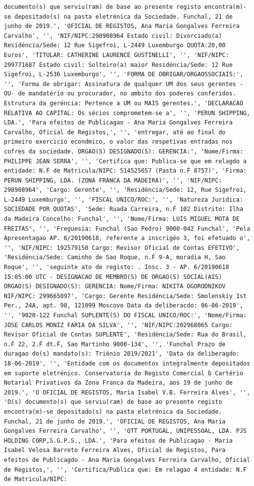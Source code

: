 \documentclass[
  12pt,
]{article}
\begin{document}
\begin{verbatim}
documento(s) que serviu(ram) de base ao presente registo encontra(m)-se depositado(s) na pasta eletrénica da Sociedade. Funchal, 21 de junho de 2019.', 'OFICIAL DE REGISTOS, Ana Maria Gongalves Ferreira Carvalho', '', 'NIF/NIPC:298908964 Estado civil: Divorciado(a) Residéncia/Sede: 12 Rue Sigefroi, L-2449 Luxemburgo QUOTA:20,00 Euros', 'TITULAR: CATHERINE LAURENCE GUSTINELLI', '', 'NIF/NIPC: 299771687 Estado civil: Solteiro(a) maior Residéncia/Sede: 12 Rue Sigefroi, L-2536 Luxemburgo', '', 'FORMA DE OBRIGAR/ORGAOSSOCIAIS:', '', 'Forma de obrigar: Assinatura de qualquer UM dos seus gerentes -OU- de mandatério ou procurador, no ambito dos poderes conferidos. Estrutura da geréncia: Pertence a UM ou MAIS gerentes.', 'DECLARACAO RELATIVA AO CAPITAL: Os sécios comprometem-se a', '', 'PERUN SHIPPING, LDA.', 'Para efeitos de Publicagao - Ana Maria Gongalves Ferreira Carvalho, Oficial de Registos,', '', 'entregar, até ao final do primeiro exercicio econdmico, o valor das respetivas entradas nos cofres da sociedade. ORGAO(S) DESIGNADO(S): GERENCIA:', 'Nome/Firma: PHILIPPE JEAN SERRA', '', 'Certifica que: Publica-se que em relagdo a entidade: N.Ḟ de Matricula/NIPC: 514525657 (Pasta n.Ḟ 8757)', 'Firma: PERUN SHIPPING, LDA. (ZONA FRANCA DA MADEIRA)', '', 'NIF/NIPC: 298908964', 'Cargo: Gerente', '', 'Residéncia/Sede: 12, Rue Sigefroi, L-2449 Luxemburgo', '', 'FISCAL UNICO/ROC:', '', 'Natureza Juridica: SOCIEDADE POR QUOTAS', 'Sede: Ruada Carreira, n.Ḟ 102 Distrito: Ilha da Madeira Concelho: Funchal', '', 'Nome/Firma: LUIS MIGUEL MOTA DE FREITAS', '', 'Freguesia: Funchal (Sao Pedro) 9000-042 Funchal', 'Pela Apresentagao AP. 6/20190618, referente a inscrigéo 3, foi efetuado o', '', 'NIF/NIPC: 192579150 Cargo: Revisor Oficial de Contas EFETIVO', 'Residéncia/Sede: Caminho de Sao Roque, n.Ḟ 9-A, moradia H, Sao Roque', '', 'seguinte ato de registo: . Insc. 3 - AP. 6/20190618 15:05:00 UTC - DESIGNACAO DE MEMBRO(S) DE ORGAO(S) SOCIAL(AIS) ORGAO(S) DESIGNADO(S): GERENCIA: Nome/Firma: NIKITA OGORODNIKOV NIF/NIPC: 299665097', 'Cargo: Gerente Residéncia/Sede: Smolenskiy 1st Per., 24A, apt. 98, 121099 Moscovo Data da deliberacdo: 06-06-2019', '', '9020-122 Funchal SUPLENTE(S) DO FISCAL UNICO/ROC:', 'Nome/Firma: JOSE CARLOS MONIZ FARIA DA SILVA', '', 'NIF/NIPC:202968065 Cargo: Revisor Oficial de Contas SUPLENTE', 'Residéncia/Sede: Rua do Brasil, n.Ḟ 22, 2.Ḟ dt.Ḟ, Sao Martinho 9000-134', '', 'Funchal Prazo de duragao do(s) mandato(s): Triénio 2019/2021', 'Data da deliberagdo: 18-06-2019', '', 'Entidade com os documentos integralmente depositados em suporte eletrénico. Conservatoria do Registo Comercial ḃ Cartério Notarial Privativos da Zona Franca da Madeira, aos 19 de junho de 2019.', 'O OFICIAL DE REGISTOS, Maria Isabel V.B. Ferreira Alves', '', 'O(s) documento(s) que serviu(ram) de base ao presente registo encontra(m)-se depositado(s) na pasta eletrénica da Sociedade. Funchal, 21 de junho de 2019.', 'OFICIAL DE REGISTOS, Ana Maria Gongalves Ferreira Carvalho', '', 'QTT PORTUGAL, UNIPESSOAL, LDA. PJS HOLDING CORP,S.G.P.S., LDA.', 'Para efeitos de Publicagao - Maria Isabel Velosa Barreto Ferreira Alves, Oficial de Registos, Para efeitos de Publicagdo - Ana Maria Gongalves Ferreira Carvalho, Oficial de Registos,', '', 'Certifica/Publica que: Em relagao 4 entidade: N.Ḟ de Matricula/NIPC: 
\end{verbatim}
\end{document}
